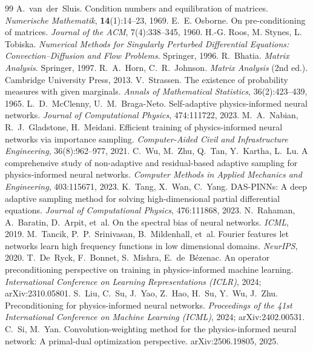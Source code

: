 \documentclass[11pt]{article}
\numberwithin{equation}{section}
\begin{document}
\begin{thebibliography}{99}
 A.~van~der~Sluis. Condition numbers and equilibration of matrices. \emph{Numerische Mathematik}, \textbf{14}(1):14--23, 1969.
 E.~E. Osborne. On pre-conditioning of matrices. \emph{Journal of the ACM}, 7(4):338--345, 1960.
 H.-G. Roos, M. Stynes, L. Tobiska. \emph{Numerical Methods for Singularly Perturbed Differential Equations: Convection--Diffusion and Flow Problems}. Springer, 1996.
 R.~Bhatia. \emph{Matrix Analysis}. Springer, 1997.
 R.~A.~Horn, C.~R.~Johnson. \emph{Matrix Analysis} (2nd ed.). Cambridge University Press, 2013.
 V.~Strassen. The existence of probability measures with given marginals. \emph{Annals of Mathematical Statistics}, 36(2):423--439, 1965.
 L.~D.~McClenny, U.~M.~Braga-Neto. Self-adaptive physics-informed neural networks. \emph{Journal of Computational Physics}, 474:111722, 2023.
 M.~A.~Nabian, R.~J.~Gladstone, H.~Meidani. Efficient training of physics-informed neural networks via importance sampling. \emph{Computer-Aided Civil and Infrastructure Engineering}, 36(8):962--977, 2021.
 C.~Wu, M.~Zhu, Q.~Tan, Y.~Kartha, L.~Lu. A comprehensive study of non-adaptive and residual-based adaptive sampling for physics-informed neural networks. \emph{Computer Methods in Applied Mechanics and Engineering}, 403:115671, 2023.
 K.~Tang, X.~Wan, C.~Yang. DAS-PINNs: A deep adaptive sampling method for solving high-dimensional partial differential equations. \emph{Journal of Computational Physics}, 476:111868, 2023.
 N.~Rahaman, A.~Baratin, D.~Arpit, et~al. On the spectral bias of neural networks. \emph{ICML}, 2019.
 M.~Tancik, P.~P.~Srinivasan, B.~Mildenhall, et~al. Fourier features let networks learn high frequency functions in low dimensional domains. \emph{NeurIPS}, 2020.
 T.~De~Ryck, F.~Bonnet, S.~Mishra, E.~de~B\'ezenac. An operator preconditioning perspective on training in physics-informed machine learning. \emph{International Conference on Learning Representations (ICLR)}, 2024; arXiv:2310.05801.
 S.~Liu, C.~Su, J.~Yao, Z.~Hao, H.~Su, Y.~Wu, J.~Zhu. Preconditioning for physics-informed neural networks. \emph{Proceedings of the 41st International Conference on Machine Learning (ICML)}, 2024; arXiv:2402.00531.
 C.~Si, M.~Yan. Convolution-weighting method for the physics-informed neural network: A primal-dual optimization perspective. arXiv:2506.19805, 2025.

\end{thebibliography}
\end{document}
